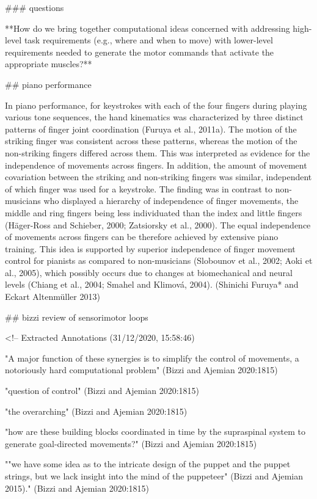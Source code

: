 \documentclass[../main.tex]{subfiles}
\begin{document}
{{### questions

**How do we bring together computational ideas concerned with addressing high-level task requirements (e.g., where and when to move) with lower-level requirements needed to generate the motor commands that activate the appropriate muscles?**


## piano performance 

In piano performance, for keystrokes with each of the four fingers during playing various tone sequences, the hand kinematics was characterized by three distinct patterns of finger joint coordination (Furuya et al., 2011a). The motion of the striking finger was consistent across these patterns, whereas the motion of the non-striking fingers differed across them. This was interpreted as evidence for the independence of movements across fingers. In addition, the amount of movement covariation between the striking and non-striking fingers was similar, independent of which finger was used for a keystroke. The finding was in contrast to non-musicians who displayed a hierarchy of independence of finger movements, the middle and ring fingers being less individuated than the index and little fingers (Häger-Ross and Schieber, 2000; Zatsiorsky et al., 2000). The equal independence of movements across fingers can be therefore achieved by extensive piano training. This idea is supported by superior independence of finger movement control for pianists as compared to non-musicians (Slobounov et al., 2002; Aoki et al., 2005), which possibly occurs due to changes at biomechanical and neural levels (Chiang et al., 2004; Smahel and Klimová, 2004). (Shinichi Furuya* and Eckart Altenmüller 2013)



## bizzi review of sensorimotor loops

<!-- Extracted Annotations (31/12/2020, 15:58:46)

"A major function of these synergies is to simplify the control of movements, a notoriously hard computational problem" (Bizzi and Ajemian 2020:1815)

"question of control" (Bizzi and Ajemian 2020:1815)

"the overarching" (Bizzi and Ajemian 2020:1815)

"how are these building blocks coordinated in time by the supraspinal system to generate goal-directed movements?" (Bizzi and Ajemian 2020:1815)

""we have some idea as to the intricate design of the puppet and the puppet strings, but we lack insight into the mind of the puppeteer" (Bizzi and Ajemian 2015)." (Bizzi and Ajemian 2020:1815)

}}
\end{document}
